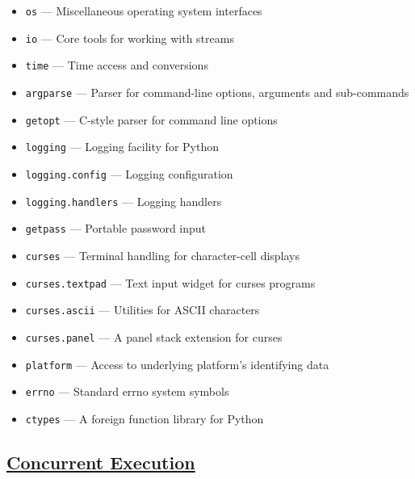 \documentclass[]{book}
\providecommand{\tightlist}{%
  \setlength{\itemsep}{0pt}\setlength{\parskip}{0pt}}
\theoremstyle{definition}
\theoremstyle{definition}
\theoremstyle{definition}
\theoremstyle{remark}
\begin{document}
\begin{itemize}
\tightlist
\item
  \texttt{os} --- Miscellaneous operating system interfaces
\item
  \texttt{io} --- Core tools for working with streams
\item
  \texttt{time} --- Time access and conversions
\item
  \texttt{argparse} --- Parser for command-line options, arguments and
  sub-commands
\item
  \texttt{getopt} --- C-style parser for command line options
\item
  \texttt{logging} --- Logging facility for Python
\item
  \texttt{logging.config} --- Logging configuration
\item
  \texttt{logging.handlers} --- Logging handlers
\item
  \texttt{getpass} --- Portable password input
\item
  \texttt{curses} --- Terminal handling for character-cell displays
\item
  \texttt{curses.textpad} --- Text input widget for curses programs
\item
  \texttt{curses.ascii} --- Utilities for ASCII characters
\item
  \texttt{curses.panel} --- A panel stack extension for curses
\item
  \texttt{platform} --- Access to underlying platform's identifying data
\item
  \texttt{errno} --- Standard errno system symbols
\item
  \texttt{ctypes} --- A foreign function library for Python
\end{itemize}

\subsection{\texorpdfstring{\href{https://docs.python.org/3.7/library/concurrency.html}{Concurrent
Execution}}{Concurrent Execution}}\label{concurrent-execution}
\end{document}
